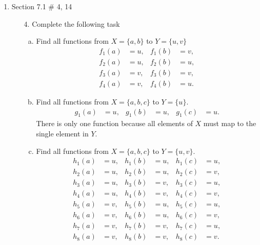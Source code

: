 \documentclass[12pt]{article}
\begin{document}
\begin{enumerate}
\begin{enumerate}
        \end{enumerate}
    \newpage
    \item Section 7.1 \# 4, 14
        \begin{enumerate}
            \item[4.] Complete the following task
                \begin{enumerate}[a.]
                    \item Find all functions from $X = \{a,b\}$ to $Y = \{u,v\}$
                \begin{align*}
                    f_1(a) &= u, & f_1(b) &= v, \\
                    f_2(a) &= u, & f_2(b) &= u, \\
                    f_3(a) &= v, & f_3(b) &= v, \\
                    f_4(a) &= v, & f_4(b) &= u.
                \end{align*}
                
                \item Find all functions from $X = \{a,b,c\}$ to $Y = \{u\}$.
                \begin{align*}
                    g_1(a) &= u, & g_1(b) &= u, & g_1(c) &= u.
                \end{align*}
                There is only one function because all elements of $X$ must map to the single element in $Y$.
                
                \item Find all functions from $X = \{a,b,c\}$ to $Y = \{u,v\}$.
                \begin{align*}
                    h_1(a) &= u, & h_1(b) &= u, & h_1(c) &= u, \\
                    h_2(a) &= u, & h_2(b) &= u, & h_2(c) &= v, \\
                    h_3(a) &= u, & h_3(b) &= v, & h_3(c) &= u, \\
                    h_4(a) &= u, & h_4(b) &= v, & h_4(c) &= v, \\
                    h_5(a) &= v, & h_5(b) &= u, & h_5(c) &= u, \\
                    h_6(a) &= v, & h_6(b) &= u, & h_6(c) &= v, \\
                    h_7(a) &= v, & h_7(b) &= v, & h_7(c) &= u, \\
                    h_8(a) &= v, & h_8(b) &= v, & h_8(c) &= v.
                \end{align*}
                \end{enumerate}


\end{enumerate}
\end{enumerate}
\end{document}
